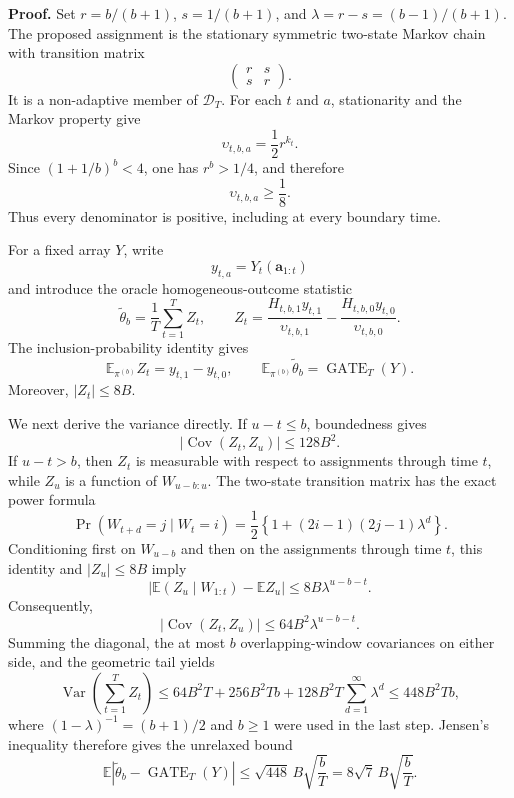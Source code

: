 \textbf{Proof.} Set \(r=b/(b+1)\), \(s=1/(b+1)\), and \(\lambda=r-s=(b-1)/(b+1)\). The proposed assignment is the stationary symmetric two-state Markov chain with transition matrix
\[
\begin{pmatrix}r&s\\s&r\end{pmatrix}.
\]
It is a non-adaptive member of \(\mathcal D_T\). For each \(t\) and \(a\), stationarity and the Markov property give
\[
\upsilon_{t,b,a}=\frac12r^{k_t}.
\]
Since \((1+1/b)^b<4\), one has \(r^b>1/4\), and therefore
\[
\upsilon_{t,b,a}\ge\frac18.
\]
Thus every denominator is positive, including at every boundary time.

For a fixed array \(Y\), write
\[
y_{t,a}=Y_t(\mathbf a_{1:t})
\]
and introduce the oracle homogeneous-outcome statistic
\[
\widetilde\theta_b=\frac1T\sum_{t=1}^TZ_t,
\qquad
Z_t=\frac{H_{t,b,1}y_{t,1}}{\upsilon_{t,b,1}}-\frac{H_{t,b,0}y_{t,0}}{\upsilon_{t,b,0}}.
\]
The inclusion-probability identity gives
\[
\mathbb E_{\pi^{(b)}}Z_t=y_{t,1}-y_{t,0},
\qquad
\mathbb E_{\pi^{(b)}}\widetilde\theta_b=\operatorname{GATE}_T(Y).
\]
Moreover, \(\lvert Z_t\rvert\le8B\).

We next derive the variance directly. If \(u-t\le b\), boundedness gives
\[
\lvert\operatorname{Cov}(Z_t,Z_u)\rvert\le128B^2.
\]
If \(u-t>b\), then \(Z_t\) is measurable with respect to assignments through time \(t\), while \(Z_u\) is a function of \(W_{u-b:u}\). The two-state transition matrix has the exact power formula
\[
\Pr(W_{t+d}=j\mid W_t=i)=\frac12\left\{1+(2i-1)(2j-1)\lambda^d\right\}.
\]
Conditioning first on \(W_{u-b}\) and then on the assignments through time \(t\), this identity and \(\lvert Z_u\rvert\le8B\) imply
\[
\left\lvert\mathbb E(Z_u\mid W_{1:t})-\mathbb EZ_u\right\rvert\le8B\lambda^{u-b-t}.
\]
Consequently,
\[
\lvert\operatorname{Cov}(Z_t,Z_u)\rvert\le64B^2\lambda^{u-b-t}.
\]
Summing the diagonal, the at most \(b\) overlapping-window covariances on either side, and the geometric tail yields
\[
\operatorname{Var}\left(\sum_{t=1}^TZ_t\right)
\le64B^2T+256B^2Tb+128B^2T\sum_{d=1}^{\infty}\lambda^d
\le448B^2Tb,
\]
where \((1-\lambda)^{-1}=(b+1)/2\) and \(b\ge1\) were used in the last step. Jensen's inequality therefore gives the unrelaxed bound
\[
\mathbb E\left\lvert\widetilde\theta_b-\operatorname{GATE}_T(Y)\right\rvert
\le\sqrt{448}\,B\sqrt{\frac bT}
=8\sqrt7\,B\sqrt{\frac bT}.
\]

